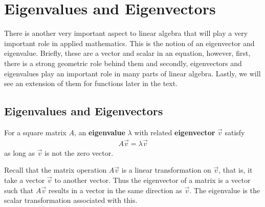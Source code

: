 

\chapter{Eigenvalues and Eigenvectors}

There is another very important aspect to linear algebra that will play a very important role in applied mathematics.  This is the notion of an eigenvector and eigenvalue. Briefly, these are a vector and scalar in an equation, however, first, there is a strong geometric role behind them and secondly, eigenvectors and eigenvalues play an important role in many parts of linear algebra.  Lastly, we will see an extension of them for functions later in the text.  

\section{Eigenvalues and Eigenvectors} \label{sect:eigenvalues}

\begin{definition}
 For a square matrix $A$, an \textbf{eigenvalue} $\lambda$ with related \textbf{eigenvector} $\vec{v}$ satisfy
\begin{align*}
 A \vec{v} = \lambda \vec{v} 
\end{align*}
as long as $\vec{v}$ is not the zero vector.  
\end{definition}

Recall that the matrix operation $A \vec{v}$ is a linear transformation on $\vec{v}$, that is, it take a vector $\vec{v}$ to another vector.   Thus the eigenvector of a matrix is a vector such that $A\vec{v}$ results in a vector in the same direction as $\vec{v}$.  The eigenvalue is the scalar transformation associated with this. 

